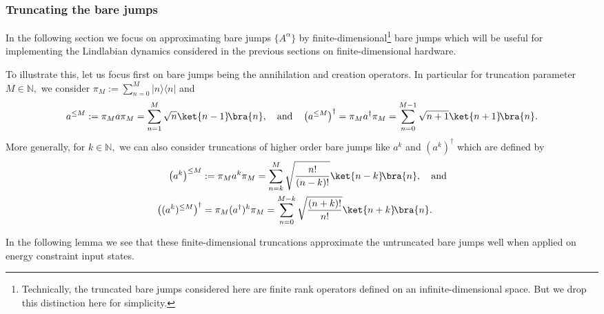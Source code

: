 \documentclass[11pt]{amsart}
\newcommand{\1}{\mathbbm{1}}
\newcommand{\kb}[1]{|#1\rangle\!\langle#1|}
\newcommand{\N}{\mathbb{N}}
\theoremstyle{plain}
\theoremstyle{definition}
\theoremstyle{remark}
\numberwithin{equation}{section}
\begin{document}
   
\subsubsection{Truncating the bare jumps}
\label{sec:TruncateJumps}
In the following section we focus on approximating bare jumps $\{A^\alpha\}$ by finite-dimensional\footnote{Technically, the truncated bare jumps considered here are finite rank operators defined on an infinite-dimensional space. But we drop this distinction here for simplicity.} bare jumps which will be useful for implementing the Lindlabian dynamics considered in the previous sections on finite-dimensional hardware.

To illustrate this, let us focus first on bare jumps being the  annihilation and creation operators. In particular for truncation parameter $M\in\N,$ we consider $\pi_M:= \sum_{n=0}^M\kb{n}$ and
\begin{align}
\label{eq:DefTruncAnnCrea}
    a^{\le M} :=  \pi_Ma\pi_M=  \sum_{n=1}^M \sqrt{n}\ket{n-1}\!\bra{n},\quad\text{and}\quad\left(a^{\le M}\right)^\dagger = \pi_Ma^\dagger \pi_M=\sum_{n=0}^{M-1}\sqrt{n+1} \ket{n+1}\!\bra{n}.
\end{align}
More generally, for $k\in\N,$ we can also consider truncations of higher order bare jumps like $a^k$ and $(a^k)^\dagger$ which are defined by
\begin{align*}
    \left(a^k\right)^{\le M} &:= \pi_Ma^k\pi_M=\sum_{n=k}^M \sqrt{\frac{n!}{(n-k)!}}\ket{n-k}\!\bra{n},\quad\text{and}
\\\left((a^k)^{\le M}\right)^\dagger &=  \pi_M (a^\dagger)^k\pi_M= \sum_{n=0}^{M-k}\sqrt{\frac{(n+k)!}{n!}}\ket{n+k}\!\bra{n}.
\end{align*}

In the following lemma we see that these finite-dimensional truncations approximate the untruncated bare jumps well when applied on energy constraint input states.
\end{document}
